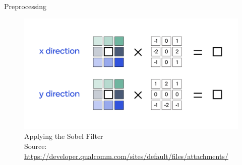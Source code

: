 \documentclass[9pt]{beamer}
\begin{document}
\begin{frame}{Preprocessing}
    \begin{figure}[h]%
    \centering
    \includegraphics[width=0.6\paperwidth]{sobel_1.png}
    \caption{Applying the Sobel Filter \\ Source: \url{https://developer.qualcomm.com/sites/default/files/attachments/}}
    \end{figure}
\end{frame}
\end{document}

